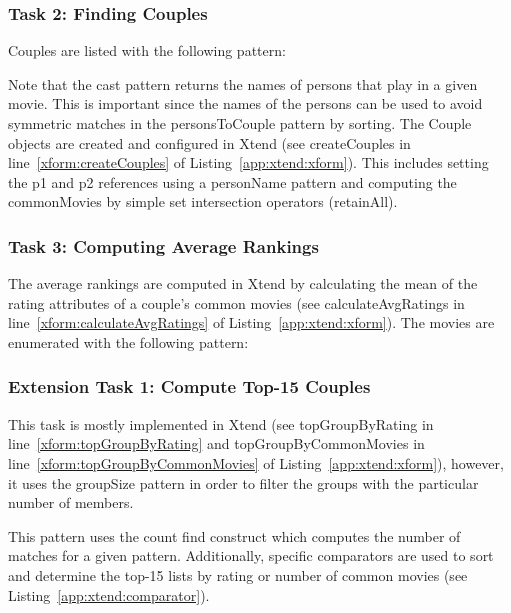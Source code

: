 \subsubsection{Task 2: Finding Couples}
\label{t2}

Couples are listed with the following pattern:


Note that the \textsf{cast} pattern returns the names of persons that play in a given movie. This is important since the names of the persons can be used to avoid symmetric matches in the \textsf{personsToCouple} pattern by sorting.
The \textsf{Couple} objects are created and configured in Xtend (see \textsf{createCouples} in line~\ref{xform:createCouples} of Listing~\ref{app:xtend:xform}). This includes setting the \textsf{p1} and \textsf{p2} references using a \textsf{personName} pattern and computing the \textsf{commonMovies} by simple set intersection operators (\textsf{retainAll}).

\subsubsection{Task 3: Computing Average Rankings}
\label{t3}

The average rankings are computed in Xtend by calculating the mean of the \textsf{rating} attributes of a couple's common movies (see \textsf{calculateAvgRatings} in line~\ref{xform:calculateAvgRatings} of Listing~\ref{app:xtend:xform}). The movies are enumerated with the following pattern:


\subsubsection{Extension Task 1: Compute Top-15 Couples}
\label{et1}

This task is mostly implemented in Xtend (see \textsf{topGroupByRating} in line~\ref{xform:topGroupByRating} and \textsf{topGroupByCommonMovies} in line~\ref{xform:topGroupByCommonMovies} of Listing~\ref{app:xtend:xform}), however, it uses the \textsf{groupSize} pattern in order to filter the groups with the particular number of members.


This pattern uses the \textsf{count find} construct which computes the number of matches for a given pattern. 
Additionally, specific comparators are used to sort and determine the top-15 lists by rating or number of common movies (see Listing~\ref{app:xtend:comparator}). 

